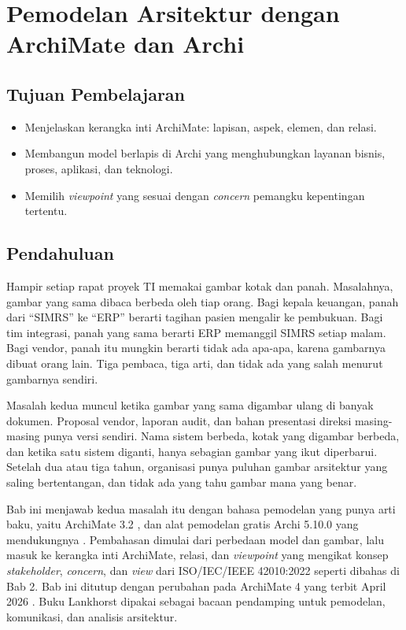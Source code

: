\chapter{Pemodelan Arsitektur dengan ArchiMate dan Archi}

\section*{Tujuan Pembelajaran}
\begin{itemize}
  \item Menjelaskan kerangka inti ArchiMate: lapisan, aspek, elemen, dan relasi.
  \item Membangun model berlapis di Archi yang menghubungkan layanan bisnis, proses, aplikasi, dan teknologi.
  \item Memilih \textit{viewpoint} yang sesuai dengan \textit{concern} pemangku kepentingan tertentu.
\end{itemize}

\section{Pendahuluan}

Hampir setiap rapat proyek TI memakai gambar kotak dan panah. Masalahnya,
gambar yang sama dibaca berbeda oleh tiap orang. Bagi kepala keuangan, panah
dari ``SIMRS'' ke ``ERP'' berarti tagihan pasien mengalir ke pembukuan. Bagi
tim integrasi, panah yang sama berarti ERP memanggil SIMRS setiap malam.
Bagi vendor, panah itu mungkin berarti tidak ada apa-apa, karena gambarnya
dibuat orang lain. Tiga pembaca, tiga arti, dan tidak ada yang salah menurut
gambarnya sendiri.

Masalah kedua muncul ketika gambar yang sama digambar ulang di banyak
dokumen. Proposal vendor, laporan audit, dan bahan presentasi direksi
masing-masing punya versi sendiri. Nama sistem berbeda, kotak yang
digambar berbeda, dan ketika satu sistem diganti, hanya sebagian gambar yang
ikut diperbarui. Setelah dua atau tiga tahun, organisasi punya puluhan gambar
arsitektur yang saling bertentangan, dan tidak ada yang tahu gambar mana yang
benar.

Bab ini menjawab kedua masalah itu dengan bahasa pemodelan yang punya arti
baku, yaitu ArchiMate 3.2 \cite{archimate32}, dan alat pemodelan gratis Archi
5.10.0 yang mendukungnya \cite{archi}. Pembahasan dimulai dari perbedaan
model dan gambar, lalu masuk ke kerangka inti ArchiMate, relasi, dan
\textit{viewpoint} yang mengikat konsep \textit{stakeholder}, \textit{concern},
dan \textit{view} dari ISO/IEC/IEEE 42010:2022 \cite{iso42010} seperti dibahas
di Bab 2. Bab ini ditutup dengan perubahan pada ArchiMate 4 yang terbit April
2026 \cite{archimate4}. Buku Lankhorst \cite{lankhorst2017} dipakai sebagai
bacaan pendamping untuk pemodelan, komunikasi, dan analisis arsitektur.

